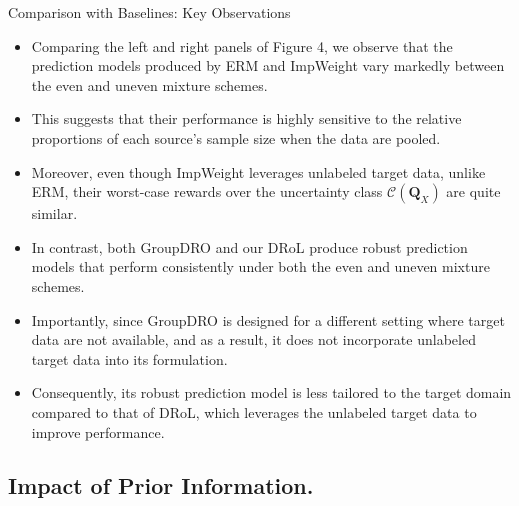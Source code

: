 \documentclass{beamer}
\begin{document}
\begin{frame}{Comparison with Baselines: Key Observations}
    \begin{itemize}
        \item Comparing the left and right panels of Figure 4, we observe that the prediction models produced by ERM and ImpWeight vary markedly between the even and uneven mixture schemes.
        \item This suggests that their performance is highly sensitive to the relative proportions of each source’s sample size when the data are pooled.
        \item Moreover, even though ImpWeight leverages unlabeled target data, unlike ERM, their worst-case rewards over the uncertainty class $\mathcal{C}(\mathbf{Q}_X)$ are quite similar.
        \item In contrast, both GroupDRO and our DRoL produce robust prediction models that perform consistently under both the even and uneven mixture schemes.
        \item Importantly, since GroupDRO is designed for a different setting where target data are not available, and as a result, it does not incorporate unlabeled target data into its formulation.
        \item Consequently, its robust prediction model is less tailored to the target domain compared to that of DRoL, which leverages the unlabeled target data to improve performance.
    \end{itemize}
\end{frame}

\subsection{Impact of Prior Information.}
\end{document}
